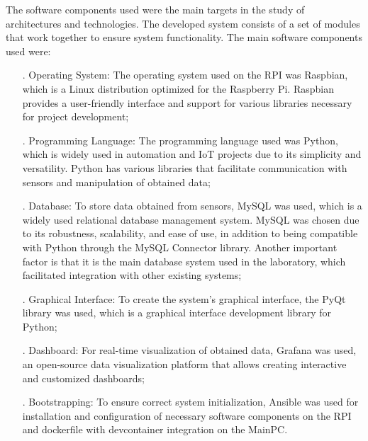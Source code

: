 The software components used were the main targets in the study of architectures and technologies. The developed system consists of a set of modules that work together to ensure system functionality. The main software components used were: 
\begin{itemize}
    \item[.] Operating System: The operating system used on the RPI was Raspbian, which is a Linux distribution optimized for the Raspberry Pi. Raspbian provides a user-friendly interface and support for various libraries necessary for project development;
    \item[.] Programming Language: The programming language used was Python, which is widely used in automation and IoT projects due to its simplicity and versatility. Python has various libraries that facilitate communication with sensors and manipulation of obtained data;
    \item[.] Database: To store data obtained from sensors, MySQL was used, which is a widely used relational database management system. MySQL was chosen due to its robustness, scalability, and ease of use, in addition to being compatible with Python through the MySQL Connector library. Another important factor is that it is the main database system used in the laboratory, which facilitated integration with other existing systems;
    \item[.] Graphical Interface: To create the system's graphical interface, the PyQt library was used, which is a graphical interface development library for Python;
    \item[.] Dashboard: For real-time visualization of obtained data, Grafana was used, an open-source data visualization platform that allows creating interactive and customized dashboards;
    \item[.] Bootstrapping: To ensure correct system initialization, Ansible was used for installation and configuration of necessary software components on the RPI and dockerfile with devcontainer integration on the MainPC.
\end{itemize}

